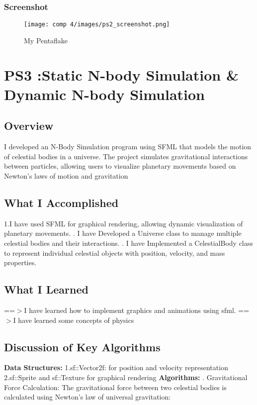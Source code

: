 \documentclass[12pt]{article}
\begin{document}
\newpage
\subsubsection{Screenshot}
\begin{figure}[tbh]
	\centering
	\texttt{[image: comp 4/images/ps2\_screenshot.png]}
	\caption{My Pentaflake}
	
\end{figure}
\newpage
\section{PS3 :Static N-body Simulation \& Dynamic N-body Simulation}
\subsection{Overview}
I developed an N-Body Simulation program using SFML that models the motion of celestial bodies in a universe. The project simulates gravitational interactions between particles, allowing users to visualize planetary movements based on Newton's laws of motion and gravitation
\subsection{What I Accomplished}
1.I have used SFML for graphical rendering, allowing dynamic visualization of planetary movements.
. I have Developed a Universe class to manage multiple celestial bodies and their interactions.
. I have Implemented a CelestialBody class to represent individual celestial objects with position, velocity, and mass properties.
\subsection{What I Learned}
==$>$I have learned how to implement graphics and animations using sfml.
\newline
==$>$I have learned some concepts of physics
\subsection{Discussion of Key Algorithms}
\textbf{Data Structures:}
\newline
1.sf::Vector2f:
\newline
for position and velocity representation
\newline
2.sf::Sprite and sf::Texture 
\newline
for graphical rendering
\newline
\textbf{Algorithms:}
. Gravitational Force Calculation:
\newline
The gravitational force between two celestial bodies is calculated using Newton's law of universal gravitation:
\end{document}
